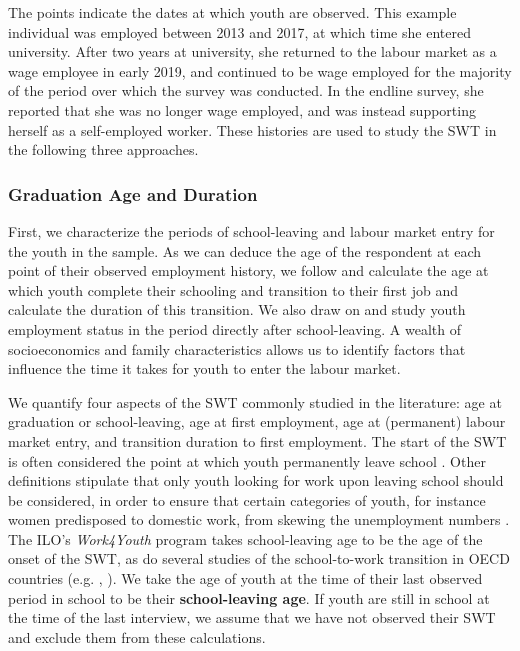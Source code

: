 \documentclass[
  a4paper, twoside, 12pt]{book}
\begin{document}
\begin{figure}[H]
\centering
{}
\end{figure}

The points indicate the dates at which youth are observed. This example individual was employed between 2013 and 2017, at which time she entered university. After two years at university, she returned to the labour market as a wage employee in early 2019, and continued to be wage employed for the majority of the period over which the survey was conducted. In the endline survey, she reported that she was no longer wage employed, and was instead supporting herself as a self-employed worker. These histories are used to study the SWT in the following three approaches.

\hypertarget{onset}{%
\subsubsection*{Graduation Age and Duration}\label{onset}}

First, we characterize the periods of school-leaving and labour market entry for the youth in the sample. As we can deduce the age of the respondent at each point of their observed employment history, we follow \textcite{manacorda2017} and calculate the age at which youth complete their schooling and transition to their first job and calculate the duration of this transition. We also draw on \textcite{bridges2017} and study youth employment status in the period directly after school-leaving. A wealth of socioeconomics and family characteristics allows us to identify factors that influence the time it takes for youth to enter the labour market.

We quantify four aspects of the SWT commonly studied in the literature: age at graduation or school-leaving, age at first employment, age at (permanent) labour market entry, and transition duration to first employment. The start of the SWT is often considered the point at which youth permanently leave school \autocite{bowers1998,nilsson2019}. Other definitions stipulate that only youth looking for work upon leaving school should be considered, in order to ensure that certain categories of youth, for instance women predisposed to domestic work, from skewing the unemployment numbers \autocite{matsumoto2010}. The ILO's \emph{Work4Youth} program takes school-leaving age to be the age of the onset of the SWT, as do several studies of the school-to-work transition in OECD countries (e.g. \textcite{bowers1998}, \textcite{quintini2007}). We take the age of youth at the time of their last observed period in school to be their \textbf{school-leaving age}. If youth are still in school at the time of the last interview, we assume that we have not observed their SWT and exclude them from these calculations.
\end{document}
